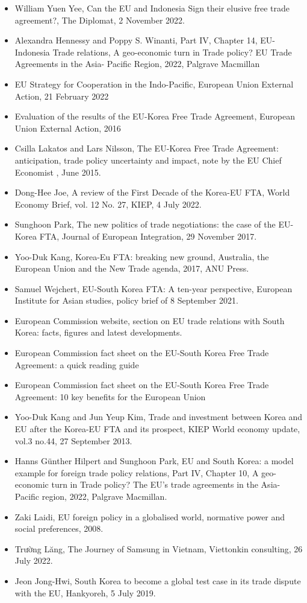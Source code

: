 \documentclass[11pt,a4paper]{article}
\begin{document}
\begin{itemize}[leftmargin=1.3em,itemsep=.18em,topsep=.25em]
  \item William Yuen Yee, Can the EU and Indonesia Sign their elusive free trade agreement?, The Diplomat, 2 November 2022.
  \item Alexandra Hennessy and Poppy S. Winanti, Part IV, Chapter 14, EU-Indonesia Trade relations, A geo-economic turn in Trade policy? EU Trade Agreements in the Asia- Pacific Region, 2022, Palgrave Macmillan
  \item EU Strategy for Cooperation in the Indo-Pacific, European Union External Action, 21 February 2022
  \item Evaluation of the results of the EU-Korea Free Trade Agreement, European Union External Action, 2016
  \item Csilla Lakatos and Lars Nilsson, The EU-Korea Free Trade Agreement: anticipation, trade policy uncertainty and impact, note by the EU Chief Economist , June 2015.
  \item Dong-Hee Joe, A review of the First Decade of the Korea-EU FTA, World Economy Brief, vol. 12 No. 27, KIEP, 4 July 2022.
  \item Sunghoon Park, The new politics of trade negotiations: the case of the EU- Korea FTA, Journal of European Integration, 29 November 2017.
  \item Yoo-Duk Kang, Korea-Eu FTA: breaking new ground, Australia, the European Union and the New Trade agenda, 2017, ANU Press.
  \item Samuel Wejchert, EU-South Korea FTA: A ten-year perspective, European Institute for Asian studies, policy brief of 8 September 2021.
  \item European Commission website, section on EU trade relations with South Korea: facts, figures and latest developments.
  \item European Commission fact sheet on the EU-South Korea Free Trade Agreement: a quick reading guide
  \item European Commission fact sheet on the EU-South Korea Free Trade Agreement: 10 key benefits for the European Union
  \item Yoo-Duk Kang and Jun Yeup Kim, Trade and investment between Korea and EU after the Korea-EU FTA and its prospect, KIEP World economy update, vol.3 no.44, 27 September 2013.
  \item Hanns Günther Hilpert and Sunghoon Park, EU and South Korea: a model example for foreign trade policy relations, Part IV, Chapter 10, A geo-economic turn in Trade policy? The EU’s trade agreements in the Asia-Pacific region, 2022, Palgrave Macmillan.
  \item Zaki Laidi, EU foreign policy in a globalised world, normative power and social preferences, 2008.
  \item Trường Lăng, The Journey of Samsung in Vietnam, Viettonkin consulting, 26 July 2022.
  \item Jeon Jong-Hwi, South Korea to become a global test case in its trade dispute with the EU, Hankyoreh, 5 July 2019.
\end{itemize}
\end{document}
